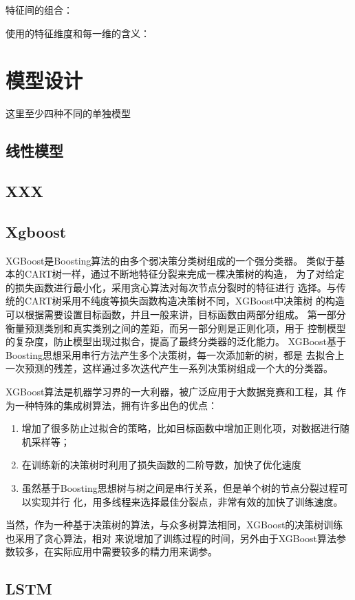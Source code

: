 \documentclass[UTF8]{ctexart}
\begin{document}
特征间的组合：

使用的特征维度和每一维的含义：

\section{模型设计}
这里至少四种不同的单独模型
\subsection{线性模型}

\subsection{XXX}

\subsection{Xgboost}
XGBoost是Boosting算法的由多个弱决策分类树组成的一个强分类器。
类似于基本的CART树一样，通过不断地特征分裂来完成一棵决策树的构造，
为了对给定的损失函数进行最小化，采用贪心算法对每次节点分裂时的特征进行
选择。与传统的CART树采用不纯度等损失函数构造决策树不同，XGBoost中决策树
的构造可以根据需要设置目标函数，并且一般来讲，目标函数由两部分组成。
第一部分衡量预测类别和真实类别之间的差距，而另一部分则是正则化项，用于
控制模型的复杂度，防止模型出现过拟合，提高了最终分类器的泛化能力。
XGBoost基于Boosting思想采用串行方法产生多个决策树，每一次添加新的树，都是
去拟合上一次预测的残差，这样通过多次迭代产生一系列决策树组成一个大的分类器。

XGBoost算法是机器学习界的一大利器，被广泛应用于大数据竞赛和工程，其
作为一种特殊的集成树算法，拥有许多出色的优点：
\begin{enumerate}[(1)]
    \item 增加了很多防止过拟合的策略，比如目标函数中增加正则化项，对数据进行随机采样等；
    \item 在训练新的决策树时利用了损失函数的二阶导数，加快了优化速度
    \item 虽然基于Boosting思想树与树之间是串行关系，但是单个树的节点分裂过程可以实现并行
    化，用多线程来选择最佳分裂点，非常有效的加快了训练速度。
\end{enumerate}

当然，作为一种基于决策树的算法，与众多树算法相同，XGBoost的决策树训练也采用了贪心算法，相对
来说增加了训练过程的时间，另外由于XGBoost算法参数较多，在实际应用中需要较多的精力用来调参。
\subsection{LSTM}
\end{document}
